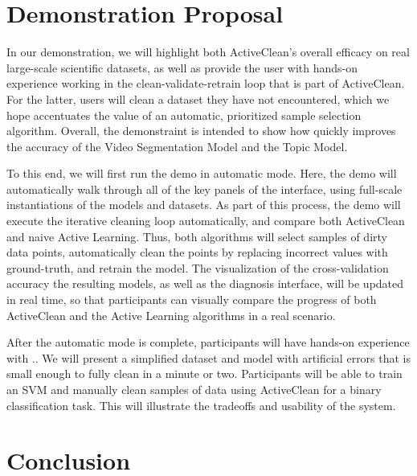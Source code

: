 \section{Demonstration Proposal}
In our demonstration, we will highlight both ActiveClean's overall efficacy on real large-scale scientific datasets, as well as provide the 
user with hands-on experience working in the clean-validate-retrain loop that is part of ActiveClean.  
For the latter, users will clean a dataset they have not encountered, which we hope accentuates the value of an automatic, prioritized sample selection algorithm. 
Overall, the demonstraint is intended to show how \sys quickly improves the accuracy of the Video Segmentation Model and the Topic Model.

To this end, we will first run the demo in automatic mode.  
Here, the demo will automatically walk through all of the key panels of the interface, using full-scale instantiations of the models and datasets.
As part of this process, the demo will execute the iterative cleaning loop automatically, and compare both ActiveClean and naive Active Learning.
Thus, both algorithms will select samples of dirty data points, automatically clean the points by replacing incorrect values with ground-truth, and retrain the model.  
The visualization of the cross-validation accuracy the resulting models, as well as the diagnosis interface, will be updated in real time, so that participants can visually compare the progress of both ActiveClean and
the Active Learning algorithms in a real scenario.



After the automatic mode is complete, participants will have hands-on experience with \sys..
We will present a simplified dataset and model with artificial errors that is small enough to fully clean in a minute or two.
Participants will be able to train an SVM and manually clean samples of data using ActiveClean for a binary classification task.
This will illustrate the tradeoffs and usability of the system.

\section{Conclusion}

